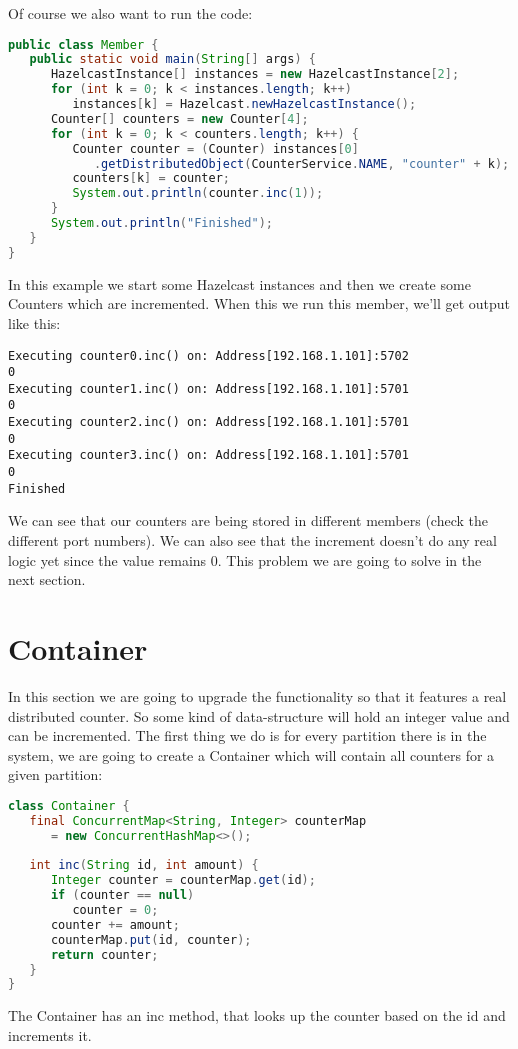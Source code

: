 Of course we also want to run the code:
\begin{lstlisting}[language=java]
public class Member {
   public static void main(String[] args) {
      HazelcastInstance[] instances = new HazelcastInstance[2];
      for (int k = 0; k < instances.length; k++) 
         instances[k] = Hazelcast.newHazelcastInstance();
      Counter[] counters = new Counter[4];
      for (int k = 0; k < counters.length; k++) {
         Counter counter = (Counter) instances[0]
            .getDistributedObject(CounterService.NAME, "counter" + k);
         counters[k] = counter;
         System.out.println(counter.inc(1));
      }
      System.out.println("Finished");
   }
}
\end{lstlisting}
In this example we start some Hazelcast instances and then we create  some Counters which are incremented. When this we run this member, we'll get output like this:
\begin{lstlisting}
Executing counter0.inc() on: Address[192.168.1.101]:5702
0
Executing counter1.inc() on: Address[192.168.1.101]:5701
0
Executing counter2.inc() on: Address[192.168.1.101]:5701
0
Executing counter3.inc() on: Address[192.168.1.101]:5701
0
Finished
\end{lstlisting}
We can see that our counters are being stored in different members (check the different port numbers). We can also see that the increment doesn't do any real logic yet since the value remains 0. This problem we are going to solve in the next section.

\section{Container}
In this section we are going to upgrade the functionality so that it features a real distributed counter. So some kind of data-structure will hold an integer value and can be incremented. The first thing we do is for every partition there is in the system, we are going to create a Container which will contain all counters for a given partition:
\begin{lstlisting}[language=java]
class Container {
   final ConcurrentMap<String, Integer> counterMap 
      = new ConcurrentHashMap<>();
   
   int inc(String id, int amount) {
      Integer counter = counterMap.get(id);
      if (counter == null) 
         counter = 0;
      counter += amount;
      counterMap.put(id, counter);
      return counter;
   }
}
\end{lstlisting}
The Container has an inc method, that looks up the counter based on the id and increments it. 

